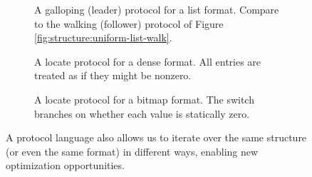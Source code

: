 \begin{figure}
\begin{minipage}[t]{0.5\linewidth - 2pt}

\begin{subfigure}[t]{\linewidth}



\caption{A galloping (leader) protocol for a list format. Compare to the walking
(follower) protocol of Figure \ref{fig:structure:uniform-list-walk}.}\label{fig:proto:gallop}
\end{subfigure}

\end{minipage}\hspace{4pt}%
\begin{minipage}[t]{0.5\linewidth - 2pt}

\begin{subfigure}[t]{\linewidth}
\resizebox{\linewidth}{!}{}


\caption{A locate protocol for a dense format. All entries are treated as if they might be nonzero.}\label{fig:proto:dense}
\end{subfigure}

\begin{subfigure}[t]{\linewidth}
\resizebox{\linewidth}{!}{}


\caption{A locate protocol for a bitmap format. The switch branches on whether each value is statically zero.}\label{fig:proto:bitmap}
\end{subfigure}
\end{minipage}

\caption{A protocol language also allows us to iterate over the same structure
(or even the same format) in different ways, enabling new optimization
opportunities.}
\end{figure}
